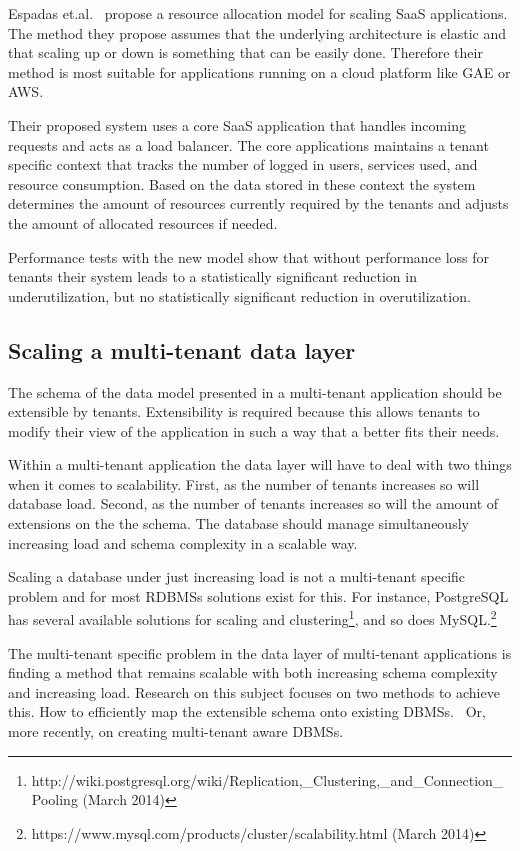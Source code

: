Espadas et.al.~\cite{espadas2013tenant} propose a resource allocation model for scaling SaaS applications.
The method they propose assumes that the underlying architecture is elastic and that scaling up or down is something that can be easily done.
Therefore their method is most suitable for applications running on a cloud platform like \ac{GAE} or \ac{AWS}. 

Their proposed system uses a core SaaS application that handles incoming requests and acts as a load balancer. The core applications maintains a tenant specific context that tracks the number of logged in users, services used, and resource consumption.
Based on the data stored in these context the system determines the amount of resources currently required by the tenants and adjusts the amount of allocated resources if needed.

Performance tests with the new model show that without performance loss for tenants their system leads to a statistically significant reduction in underutilization, but no statistically significant reduction in overutilization. 


\subsection{Scaling a multi-tenant data layer}
The schema of the data model presented in a multi-tenant application should be extensible by tenants.
Extensibility is required because this allows tenants to modify their view of the application in such a way that a better fits their needs.

Within a multi-tenant application the data layer will have to deal with two things when it comes to scalability.
First, as the number of tenants increases so will database load.
Second, as the number of tenants increases so will the amount of extensions on the the schema.
The database should  manage simultaneously increasing load and schema complexity in a scalable way.

Scaling a database under just increasing load is not a multi-tenant specific problem and for most \acp{RDBMS} solutions exist for this. 
For instance, PostgreSQL has several available solutions for scaling and clustering\footnote{http://wiki.postgresql.org/wiki/Replication,\_Clustering,\_and\_Connection\_Pooling (March 2014)}, and so does MySQL.\footnote{https://www.mysql.com/products/cluster/scalability.html (March 2014)}

The multi-tenant specific problem in the data layer of multi-tenant applications is finding a method that remains scalable with both increasing schema complexity and increasing load.
Research on this subject focuses on two methods to achieve this.
How to efficiently map the extensible schema onto existing \acp{DBMS}.~\cite{aulbach2008multi, aulbach2009comparison} 
Or, more recently, on creating multi-tenant aware \acp{DBMS}.~\cite{schiller2011native, aulbach2011extensibility} 

